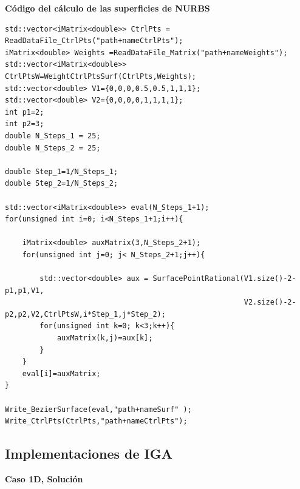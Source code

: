 \documentclass[11pt]{book}
\theoremstyle{plain} %
\theoremstyle{definition} %
\theoremstyle{definition} %
\begin{document}
\textbf{Código del cálculo de las superficies de NURBS}
\begin{verbatim}
std::vector<iMatrix<double>> CtrlPts = ReadDataFile_CtrlPts("path+nameCtrlPts");
iMatrix<double> Weights =ReadDataFile_Matrix("path+nameWeights");
std::vector<iMatrix<double>> CtrlPtsW=WeightCtrlPtsSurf(CtrlPts,Weights);
std::vector<double> V1={0,0,0,0.5,0.5,1,1,1};
std::vector<double> V2={0,0,0,0,1,1,1,1};
int p1=2;
int p2=3;
double N_Steps_1 = 25;
double N_Steps_2 = 25;

double Step_1=1/N_Steps_1;
double Step_2=1/N_Steps_2;

std::vector<iMatrix<double>> eval(N_Steps_1+1);
for(unsigned int i=0; i<N_Steps_1+1;i++){
    
    iMatrix<double> auxMatrix(3,N_Steps_2+1);
    for(unsigned int j=0; j< N_Steps_2+1;j++){
        
        std::vector<double> aux = SurfacePointRational(V1.size()-2-p1,p1,V1,
                                                       V2.size()-2-p2,p2,V2,CtrlPtsW,i*Step_1,j*Step_2);
        for(unsigned int k=0; k<3;k++){
            auxMatrix(k,j)=aux[k];
        }
    }
    eval[i]=auxMatrix;
}

Write_BezierSurface(eval,"path+nameSurf" );
Write_CtrlPts(CtrlPts,"path+nameCtrlPts");
\end{verbatim}

\subsection{Implementaciones de IGA}
\label{sec:IGAimp}

\textbf{Caso 1D, Solución}
\end{document}
